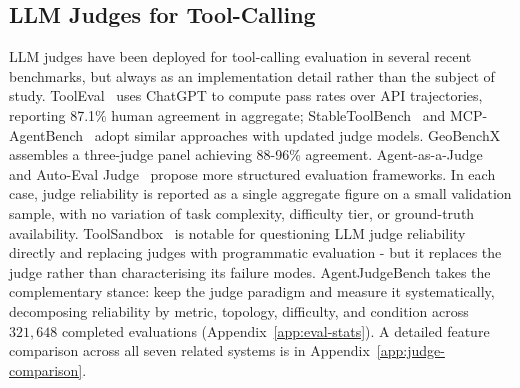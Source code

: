 \subsection{LLM Judges for Tool-Calling}
LLM judges have been deployed for tool-calling evaluation in several recent benchmarks, but always as an implementation detail rather than the subject of study. ToolEval~\cite{qin2023toolllm} uses ChatGPT to compute pass rates over API trajectories, reporting 87.1\% human agreement in aggregate; StableToolBench~\cite{guo2024stabletoolbench} and MCP-AgentBench~\cite{mcpagentbench2025} adopt similar approaches with updated judge models. GeoBenchX~\cite{krechetova2025geobenchx} assembles a three-judge panel achieving 88-96\% agreement. Agent-as-a-Judge~\cite{zhuge2024agentjudge} and Auto-Eval Judge~\cite{bhonsle2025autoeval} propose more structured evaluation frameworks. In each case, judge reliability is reported as a single aggregate figure on a small validation sample, with no variation of task complexity, difficulty tier, or ground-truth availability. ToolSandbox~\cite{lu2024toolsandbox} is notable for questioning LLM judge reliability directly and replacing judges with programmatic evaluation - but it replaces the judge rather than characterising its failure modes. AgentJudgeBench takes the complementary stance: keep the judge paradigm and measure it systematically, decomposing reliability by metric, topology, difficulty, and condition across $321{,}648$ completed evaluations (Appendix~\ref{app:eval-stats}). A detailed feature comparison across all seven related systems is in Appendix~\ref{app:judge-comparison}.
